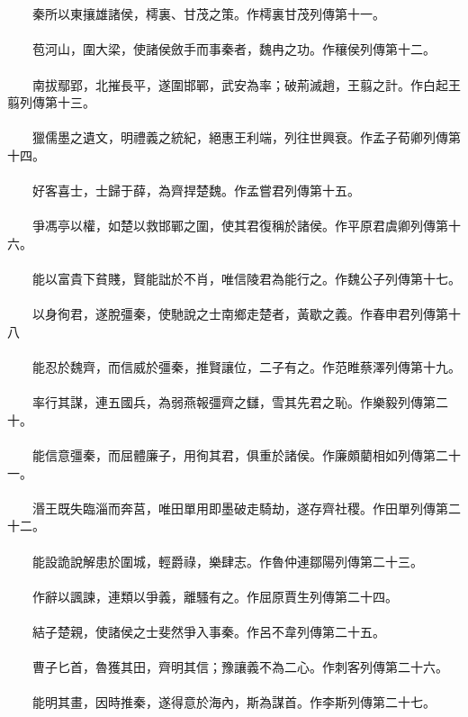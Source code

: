 \\\\
　　秦所以東攘雄諸侯，樗裏、甘茂之策。作樗裏甘茂列傳第十一。
\\\\
　　苞河山，圍大梁，使諸侯斂手而事秦者，魏冉之功。作穰侯列傳第十二。
\\\\
　　南拔鄢郢，北摧長平，遂圍邯鄲，武安為率；破荊滅趙，王翦之計。作白起王翦列傳第十三。
\\\\
　　獵儒墨之遺文，明禮義之統紀，絕惠王利端，列往世興衰。作孟子荀卿列傳第十四。
\\\\
　　好客喜士，士歸于薛，為齊捍楚魏。作孟嘗君列傳第十五。
\\\\
　　爭馮亭以權，如楚以救邯鄲之圍，使其君復稱於諸侯。作平原君虞卿列傳第十六。
\\\\
　　能以富貴下貧賤，賢能詘於不肖，唯信陵君為能行之。作魏公子列傳第十七。
\\\\
　　以身徇君，遂脫彊秦，使馳說之士南鄉走楚者，黃歇之義。作春申君列傳第十八
\\\\
　　能忍於魏齊，而信威於彊秦，推賢讓位，二子有之。作范睢蔡澤列傳第十九。
\\\\
　　率行其謀，連五國兵，為弱燕報彊齊之讎，雪其先君之恥。作樂毅列傳第二十。
\\\\
　　能信意彊秦，而屈體廉子，用徇其君，俱重於諸侯。作廉頗藺相如列傳第二十一。
\\\\
　　湣王既失臨淄而奔莒，唯田單用即墨破走騎劫，遂存齊社稷。作田單列傳第二十二。
\\\\
　　能設詭說解患於圍城，輕爵祿，樂肆志。作魯仲連鄒陽列傳第二十三。
\\\\
　　作辭以諷諫，連類以爭義，離騷有之。作屈原賈生列傳第二十四。
\\\\
　　結子楚親，使諸侯之士斐然爭入事秦。作呂不韋列傳第二十五。
\\\\
　　曹子匕首，魯獲其田，齊明其信；豫讓義不為二心。作刺客列傳第二十六。
\\\\
　　能明其畫，因時推秦，遂得意於海內，斯為謀首。作李斯列傳第二十七。
